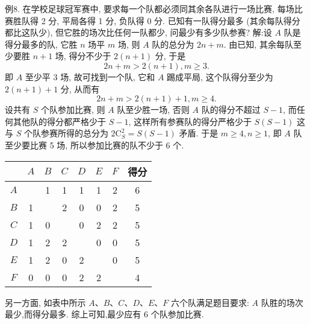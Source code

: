 例8. 在学校足球冠军赛中, 要求每一个队都必须同其余各队进行一场比赛, 每场比赛胜队得 2 分, 平局各得 1 分, 负队得 0 分.
已知有一队得分最多 (其余每队得分都比这队少), 但它胜的场次比任何一队都少, 问最少有多少队参赛?
解:设 $A$ 队是得分最多的队, 它胜 $n$ 场平 $m$ 场, 则 $A$ 队的总分为 $2 n+ m$. 由已知, 其余每队至少要胜 $n+1$ 场, 得分不少于 $2(n+1)$ 分, 于是
$$
2 n+m>2(n+1), m \geqslant 3 .
$$
即 $A$ 至少平 3 场, 故可找到一个队, 它和 $A$ 踢成平局, 这个队得分至少为
$2(n+1)+1$ 分, 从而有
$$
2 n+m>2(n+1)+1, m \geqslant 4 .
$$
设共有 $S$ 个队参加比赛, 则 $A$ 队至少胜一场, 否则 $A$ 队的得分不超过 $S-1$, 而任何其他队的得分都严格少于 $S-1$, 这样所有参赛队的得分严格少于 $S(S-1)$ 这与 $S$ 个队参赛所得的总分为 $2 \mathrm{C}_S^2=S(S-1)$ 矛盾.
于是 $m \geqslant 4, n \geqslant 1$, 即 $A$ 队至少要比赛 5 场, 所以参加比赛的队不少于 6 个.
\begin{tabular}{|c|c|c|c|c|c|c|c|}
\hline & $A$ & $B$ & $C$ & $D$ & $E$ & $F$ & 得分 \\
\hline$A$ & & 1 & 1 & 1 & 1 & 2 & 6 \\
\hline$B$ & 1 & & 2 & 0 & 0 & 2 & 5 \\
\hline$C$ & 1 & 0 & & 0 & 2 & 2 & 5 \\
\hline$D$ & 1 & 2 & 2 & & 0 & 0 & 5 \\
\hline$E$ & 1 & 2 & 0 & 2 & & 0 & 5 \\
\hline$F$ & 0 & 0 & 0 & 2 & 2 & & 4 \\
\hline
\end{tabular}
另一方面, 如表中所示 $A 、 B 、 C 、 D 、 E 、 F$ 六个队满足题目要求: $A$ 队胜的场次最少,而得分最多.
综上可知,最少应有 6 个队参加比赛.


